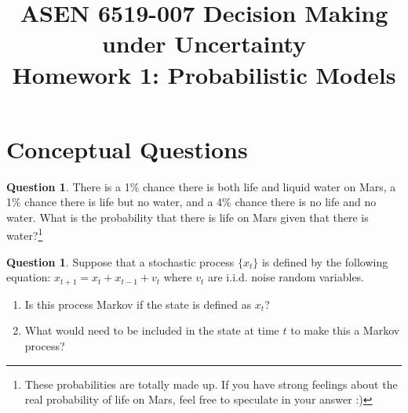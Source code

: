 \documentclass{article}
\title{ASEN 6519-007 Decision Making under Uncertainty\\
       Homework 1: Probabilistic Models}
\theoremstyle{definition}
\newtheorem{question}[thm]{Question}
\begin{document}
\maketitle

\section{Conceptual Questions}

\begin{question}
There is a 1\% chance there is both life and liquid water on Mars, a 1\% chance there is life but no
water, and a 4\% chance there is no life and no water. What is the probability that there is life on Mars given that there is water?\footnote{These probabilities are totally made up. If you have strong feelings about the real probability of life on Mars, feel free to speculate in your answer :)}
\end{question}

\begin{question}
    Suppose that a stochastic process $\{x_t\}$ is defined by the following equation: $x_{t+1} = x_t + x_{t-1} + v_{t}$ where $v_t$ are i.i.d. noise random variables.
    \begin{enumerate}[label=(\alph*)]
        \item Is this process Markov if the state is defined as $x_t$?
        \item What would need to be included in the state at time $t$ to make this a Markov process?
    \end{enumerate}
\end{question}
\end{document}
